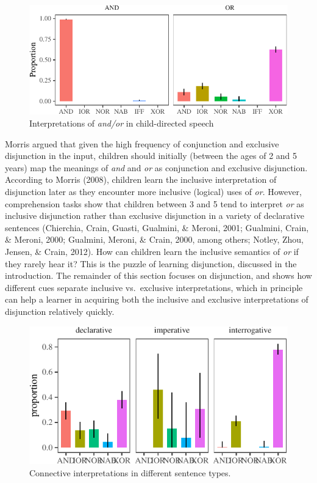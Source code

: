 \documentclass[floatsintext,man]{apa6}
\theoremstyle{definition}
\theoremstyle{definition}
\theoremstyle{definition}
\theoremstyle{remark}
\begin{document}
\begin{figure}[tb]

{\centering \includegraphics{figs/connectivePlot-1} 

}

\caption{Interpretations of \textit{and/or} in child-directed speech}\label{fig:connectivePlot}
\end{figure}

Morris argued that given the high frequency of conjunction and exclusive
disjunction in the input, children should initially (between the ages of
2 and 5 years) map the meanings of \emph{and} and \emph{or} as
conjunction and exclusive disjunction. According to Morris (2008),
children learn the inclusive interpretation of disjunction later as they
encounter more inclusive (logical) uses of \emph{or}. However,
comprehension tasks show that children between 3 and 5 tend to interpret
\emph{or} as inclusive disjunction rather than exclusive disjunction in
a variety of declarative sentences (Chierchia, Crain, Guasti, Gualmini,
\& Meroni, 2001; Gualmini, Crain, \& Meroni, 2000; Gualmini, Meroni, \&
Crain, 2000, among others; Notley, Zhou, Jensen, \& Crain, 2012). How
can children learn the inclusive semantics of \emph{or} if they rarely
hear it? This is the puzzle of learning disjunction, discussed in the
introduction. The remainder of this section focuses on disjunction, and
shows how different cues separate inclusive vs.~exclusive
interpretations, which in principle can help a learner in acquiring both
the inclusive and exclusive interpretations of disjunction relatively
quickly.

\begin{figure}[tb]

{\centering \includegraphics{figs/utterancetypePlot-1} 

}

\caption{Connective interpretations in different sentence types.}\label{fig:utterancetypePlot}
\end{figure}
\end{document}
